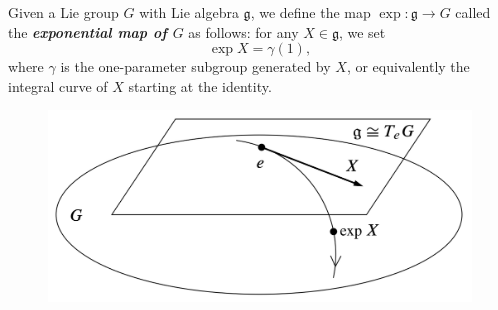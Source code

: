 \begin{defn}
	Given a Lie group $G$ with Lie algebra $\mathfrak{g}$, we define the map $\operatorname{exp}:\mathfrak{g}\to G$ called the \textbf{\textit{exponential map of $G$}} as follows: for any $X\in\mathfrak{g}$, we set
	\[\operatorname{exp} X=\gamma(1),\]
	where $\gamma$ is the one-parameter subgroup generated by $X$, or equivalently the integral curve of $X$ starting at the identity.
\end{defn}
\begin{figure}
	\centering
	\includegraphics[width=0.7\linewidth]{exp}
	\label{fig:exp}
\end{figure}

